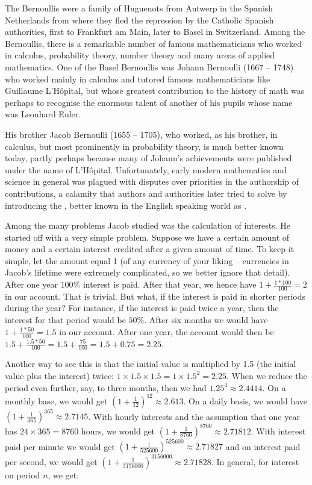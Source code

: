 \documentclass[tikz]{scrreprt}
\begin{document}
The Bernoullis were a family of Huguenots from Antwerp
in the Spanish Netherlands from where they fled the repression
by the Catholic Spanish authorities, first to Frankfurt am Main,
later to Basel in Switzerland. Among the Bernoullis,
there is a remarkable number of famous mathematicians
who worked in calculus,
probability theory, number theory and many areas 
of applied mathematics. One of the Basel Bernoullis was
Johann Bernoulli (1667 -- 1748) who worked mainly
in calculus and tutored famous mathematicians like 
Guillaume L'Hôpital, but whose greatest contribution
to the history of math was perhaps to recognise 
the enormous talent of another of his pupils 
whose name was Leonhard Euler. 

His brother Jacob Bernoulli (1655 -- 1705),
who worked, as his brother, in calculus, but
most prominently in probability theory, 
is much better known today, partly perhaps
because many of Johann's achievements 
were published under the name of L'Hôpital.
Unfortunately, early modern mathematics 
and science in general was
plagued with disputes over priorities in the
authorship of contributions, a calamity
that authors and authorities later tried to
solve by introducing the ,
better known in the English speaking world as
.

Among the many problems Jacob studied was
the calculation of interests. He started off
with a very simple problem. Suppose we have
a certain amount of money and a certain interest
credited after a given amount of time. To keep it
simple, let the amount equal 1 (of any currency
of your liking -- currencies in Jacob's lifetime
were extremely complicated, so we better ignore
that detail). After one year $100\%$ interest is paid.
After that year, we hence have $1+\frac{1*100}{100} = 2$ 
in our account. That is trivial.
But what, if the interest is paid in shorter periods
during the year?
For instance, if the interest is paid twice a year,
then the interest for that period would be $50\%$.
After six months we would have $1+\frac{1*50}{100} = 1.5$
in our account. After one year, the account would then be
$1.5 + \frac{1.5*50}{100} = 1.5 + \frac{75}{100} = 1.5 + 0.75 = 2.25$.

Another way to see this is that the initial value 
is multiplied by 1.5 (the initial value plus the interest) twice:
$1 \times 1.5 \times 1.5 = 1 \times 1.5^2 = 2.25$.
When we reduce the period even further, say, to three months,
then we had $1.25^4 \approx 2.4414$. On a monthly base,
we would get $\left(1+\frac{1}{12}\right)^{12} \approx 2.613$.
On a daily basis, we would have 
$\left(1+\frac{1}{365}\right)^{365} \approx 2.7145$.
With hourly interests and the assumption
that one year has $24 \times 365 = 8760$ hours, 
we would get $\left(1+\frac{1}{8760}\right)^{8760} \approx 2.71812$.
With interest paid per minute we would get
$\left(1+\frac{1}{525600}\right)^{525600} \approx 2.71827$ and
on interest paid per second, we would get
$\left(1+\frac{1}{3156000}\right)^{3156000} \approx 2.71828$.
In general, for interest on period $n$, we get:
\end{document}
